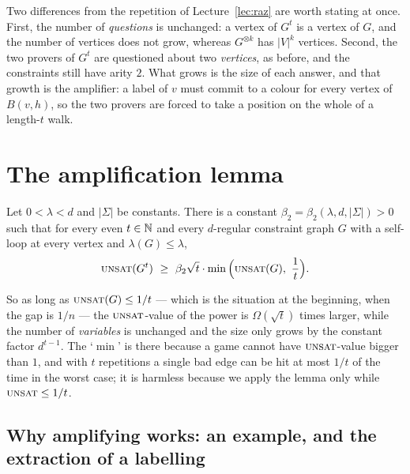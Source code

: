 \begin{remark}\label{rem:power-vs-rep}
Two differences from the repetition of Lecture~\ref{lec:raz} are worth stating at once.  First, the number of \emph{questions} is unchanged: a vertex of $G^t$ is a vertex of $G$, and the number of vertices does not grow, whereas $G^{\otimes k}$ has $|V|^k$ vertices.
Second, the two provers of $G^t$ are questioned about two \emph{vertices}, as before, and the constraints still have arity $2$.  What grows is the size of each answer, and that growth is the amplifier: a label of $v$ must commit to a colour for every vertex of $B(v,h)$, so the two provers are forced to take a position on the whole of a length-$t$ walk.
\end{remark}


\section{The amplification lemma}
\label{sec:amp}

\begin{lemma}\label{lem:amp}
Let $0<\lambda<d$ and $|\Sigma|$ be constants.  There is a constant $\beta_2=\beta_2(\lambda,d,|\Sigma|)>0$ such that for every even $t\in\mathbb{N}$ and every $d$-regular constraint graph $G$ with a self-loop at every vertex and $\lambda(G)\le\lambda$,
\[
  \textsc{unsat}(G^t)\ \ge\ \beta_2\sqrt t\cdot\min\Big(\textsc{unsat}(G),\ \frac1t\Big).
\]
\end{lemma}

\noindent
So as long as $\textsc{unsat}(G)\le1/t$ --- which is the situation at the beginning, when the gap is $1/n$ --- the $\textsc{unsat}$-value of the power is $\Omega(\sqrt t)$ times larger, while the number of \emph{variables} is unchanged and the size only grows by the constant factor $d^{t-1}$.
The `$\min$' is there because a game cannot have $\textsc{unsat}$-value bigger than $1$, and with $t$ repetitions a single bad edge can be hit at most $1/t$ of the time in the worst case; it is harmless because we apply the lemma only while $\textsc{unsat}\le1/t$.

\subsection{Why amplifying works: an example, and the extraction of a labelling}


